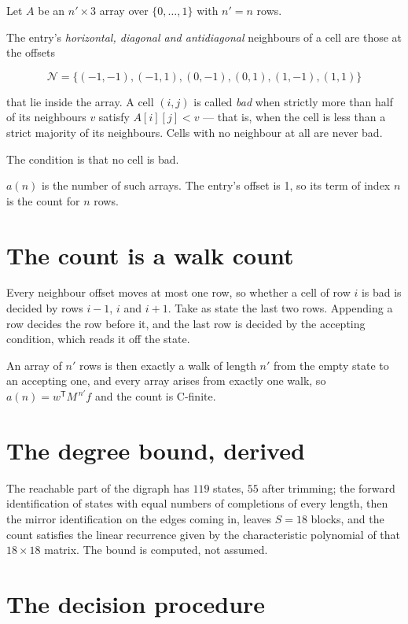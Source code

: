 \documentclass[11pt]{article}
\theoremstyle{definition}
\begin{document}
Let $A$ be an $n' \times 3$ array over $\{0,\dots,1\}$ with $n' = n$ rows.

The entry's {\itshape horizontal, diagonal and antidiagonal} neighbours of a cell are those at the offsets

\[\mathcal{N} = \{(-1,-1), (-1,1), (0,-1), (0,1), (1,-1), (1,1)\}\]

that lie inside the array. A cell $(i,j)$ is called {\itshape bad} when strictly more than half of its neighbours $v$ satisfy $A[i][j] < v$ --- that is, when the cell is less than a strict majority of its neighbours. Cells with no neighbour at all are never bad.

The condition is that no cell is bad.

$a(n)$ is the number of such arrays. The entry's offset is 1, so its term of index $n$ is the count for $n$ rows.

\section{The count is a walk count}

Every neighbour offset moves at most one row, so whether a cell of row $i$ is bad is decided by rows $i-1$, $i$ and $i+1$. Take as state the last two rows. Appending a row decides the row before it, and the last row is decided by the accepting condition, which reads it off the state.

An array of $n'$ rows is then exactly a walk of length $n'$ from the empty state to an accepting one, and every array arises from exactly one walk, so $a(n) = w^{\mathsf T}M^{\,n'}f$ and the count is C-finite.

\section{The degree bound, derived}

The reachable part of the digraph has $119$ states, $55$ after trimming; the forward identification of states with equal numbers of completions of every length, then the mirror identification on the edges coming in, leaves $S = 18$ blocks, and the count satisfies the linear recurrence given by the characteristic polynomial of that $18\times18$ matrix. The bound is computed, not assumed.

\section{The decision procedure}
\end{document}
